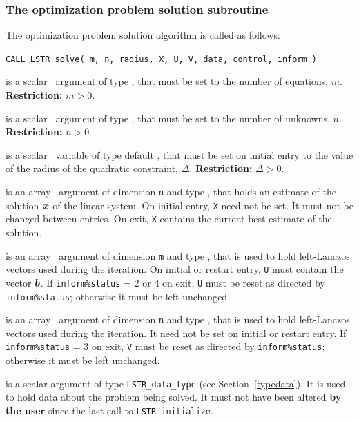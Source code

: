 \documentclass{galahad}
\newcommand{\packagename}{LS\-TR}
\begin{document}

\subsubsection{The optimization problem solution subroutine}
The optimization problem solution algorithm is called as follows:

\hskip0.5in
{\tt CALL \packagename\_solve( m, n, radius, X, U, V, data, control, inform )}

\begin{description}

 is a scalar \intentin\ argument of type \integer, that must be
set to the number of equations, $m$. {\bf Restriction: } $m > 0$.

 is a scalar \intentin\ argument of type \integer, that must be
set to the number of unknowns, $n$. {\bf Restriction: } $n > 0$.

 is a scalar \intentin\ variable of type default
\realdp,
that must be set on initial entry
to the value of the radius of the quadratic constraint, $\Delta$.
{\bf Restriction: } $\Delta > 0$.

 is an array \intentinout\ argument of dimension {\tt n} and
type \realdp,
that holds an estimate of the solution ${\bm{x}}$ of the linear system.
On initial entry, {\tt X} need not be set.
It must not be changed between entries.
On exit, {\tt X} contains the current best estimate of the solution.

 is an array \intentinout\ argument of dimension {\tt m} and
type \realdp,
that is used to hold left-Lanczos vectors used during the iteration.
On initial or restart entry, {\tt U} must contain the vector ${\bm{b}}$.
If {\tt inform\%status} = 2 or 4 on exit, {\tt U} must be reset
as directed by  {\tt inform\%status}; otherwise
it must be left unchanged.

 is an array \intentinout\ argument of dimension {\tt n} and
type \realdp,
that is used to hold left-Lanczos vectors used during the iteration.
It need not be set on initial or restart entry.
If {\tt inform\%status} = 3 on exit, {\tt V} must be reset
as directed by  {\tt inform\%status}; otherwise it must be left unchanged.

 is a scalar \intentinout argument of type
{\tt \packagename\_data\_type}
(see Section~\ref{typedata}). It is used to hold data about the problem being
solved. It must not have been altered {\bf by the user} since the last call to
{\tt \packagename\_initialize}.


\end{description}
\end{document}
